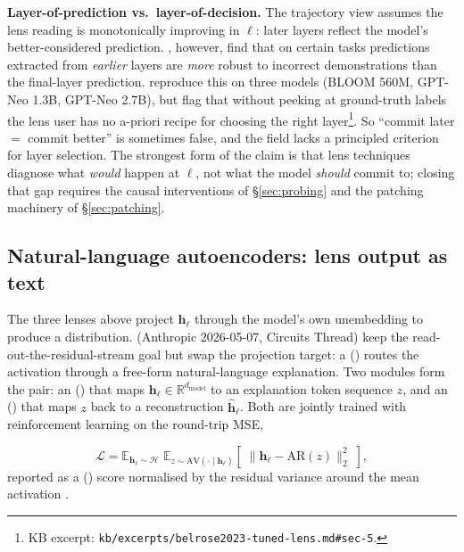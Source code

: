 \begin{contradiction}
\textbf{Layer-of-prediction vs.\ layer-of-decision.} The trajectory
view assumes the lens reading is monotonically improving in $\ell$:
later layers reflect the model's better-considered prediction.
\citet{halawi2023-overthinking}, however, find that on certain tasks
predictions extracted from \emph{earlier} layers are \emph{more}
robust to incorrect demonstrations than the final-layer prediction.
\citet[\S 5.2]{belrose2023-tuned-lens} reproduce this on three models
(BLOOM 560M, GPT-Neo 1.3B, GPT-Neo 2.7B), but flag that without
peeking at ground-truth labels the lens user has no a-priori recipe
for choosing the right layer\footnote{KB excerpt:
\texttt{kb/excerpts/belrose2023-tuned-lens.md\#sec-5}.}. So
``commit later $=$ commit better'' is sometimes false, and the field
lacks a principled criterion for layer selection. The strongest
form of the claim is that lens techniques diagnose what \emph{would}
happen at $\ell$, not what the model \emph{should} commit to; closing
that gap requires the causal interventions of \S\ref{sec:probing}
and the patching machinery of \S\ref{sec:patching}.
\end{contradiction}

\subsection{Natural-language autoencoders: lens output as text}
\label{sec:nla}

The three lenses above project $\mathbf{h}_\ell$ through the model's
own unembedding to produce a  distribution. \citet{anthropic2026-nla}
(Anthropic 2026-05-07,  Circuits Thread) keep the
read-out-the-residual-stream goal but swap the projection target:
a 
() routes the activation through a free-form natural-language
explanation. Two  modules form the pair: an
 () that
maps $\mathbf{h}_\ell \in \mathbb{R}^{d_\mathrm{model}}$ to an
explanation token sequence $z$, and an
 () that
maps $z$ back to a reconstruction $\hat{\mathbf{h}}_\ell$. Both are
jointly trained with reinforcement learning on the round-trip MSE,

\begin{equation}
\mathcal{L} = \mathbb{E}_{\mathbf{h}_\ell \sim \mathcal{H}}\;
              \mathbb{E}_{z \sim \mathrm{AV}(\cdot \mid \mathbf{h}_\ell)}
              \left[\; \lVert \mathbf{h}_\ell - \mathrm{AR}(z) \rVert_2^2 \;\right],
\label{eq:nla-loss}
\end{equation}
reported as a  () score normalised by the residual variance
around the mean activation \citep[\S method;
kb/excerpts/anthropic2026-nla\#sec-method]{anthropic2026-nla}.


